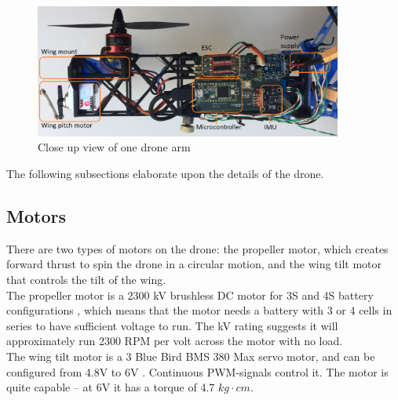 \begin{figure}[h!]
    \centering
    \includegraphics[width=0.9\textwidth]{figures/analysis/arm_closeup.png}
    \caption{Close up view of one drone arm}
    \label{fig:dronearmcloseup}
\end{figure}
The following subsections elaborate upon the details of the drone.

\subsection{Motors}
There are two types of motors on the drone: the propeller motor, which creates forward thrust to spin the drone in a circular motion, and the wing tilt motor that controls the tilt of the wing. \\
The propeller motor is a 2300 kV brushless DC motor for 3S and 4S battery configurations \cite{propellermotordata}, which means that the motor needs a battery with 3 or 4 cells in series to have sufficient voltage to run. The kV rating suggests it will approximately run 2300 RPM per volt across the motor with no load.  \\
The wing tilt motor is a 3 Blue Bird BMS 380 Max servo motor, and can be configured from 4.8V to 6V \cite{tiltmotor}. Continuous PWM-signals control it. The motor is quite capable -- at 6V it has a torque of 4.7 $kg\cdot cm$. 

